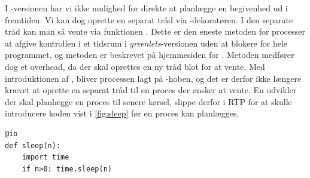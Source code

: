 I -versionen har vi ikke mulighed for direkte at planlægge en begivenhed ud i fremtiden. Vi kan dog oprette en separat tråd  via -dekoratøren. I den separate tråd kan man så vente via funktionen . Dette er den eneste metoden for processer at afgive kontrollen i et tidsrum i \emph{greenlets}-versionen uden at blokere for hele programmet, og metoden er beskrevet på  hjemmesiden for \pycsp. Metoden medfører dog et overhead, da der skal oprettes en ny tråd blot for at vente.  Med introduktionen af , bliver processen lagt på -hoben, og det er derfor ikke længere krævet at oprette en separat tråd til en proces der ønsker at vente. En udvikler der skal planlægge en proces til senere kørsel, slippe derfor i RTP for at skulle introducere koden vist i \cref{fig:sleep} før en proces kan planlægges.

\begin{lstlisting}[firstnumber=1 ,float=hbtp, label=fig:sleep, caption=Funktion der venter et antal sekunder]
@io
def sleep(n):
    import time
    if n>0: time.sleep(n)
\end{lstlisting}
 
